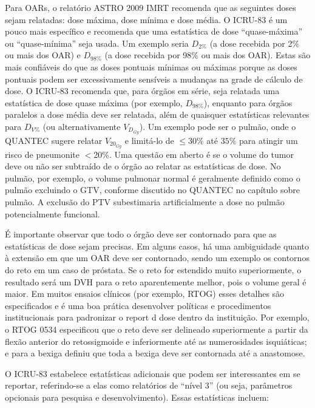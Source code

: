 \documentclass[11pt,a4paper]{article}
\newcounter{exemplo}
\begin{document}
	Para OARs, o relatório ASTRO 2009 IMRT recomenda que as seguintes doses sejam relatadas: dose máxima, dose mínima e dose média. O ICRU-83 é um pouco mais específico e recomenda que uma estatística de dose “quase-máxima” ou “quase-mínima” seja usada. Um exemplo seria $D_{2\%}$ (a dose recebida por 2\% ou mais dos OAR) e $D_{98\%}$ (a dose recebida por 98\% ou mais dos OAR). Estas são mais confiáveis do que as doses pontuais mínimas ou máximas porque as doses pontuais podem ser excessivamente sensíveis a mudanças na grade de cálculo de dose. O ICRU-83 recomenda que, para órgãos em série, seja relatada uma estatística de dose quase máxima (por exemplo, $D_{98\%}$), enquanto para órgãos paralelos a dose média deve ser relatada, além de quaisquer estatísticas relevantes para $D_{V\%}$ (ou alternativamente $V_{D_{Gy}}$). Um exemplo pode ser o pulmão, onde o QUANTEC sugere relatar $V_{20_{Gy}}$ e limitá-lo de $\leq 30\%$ até $35\%$ para atingir um risco de pneumonite $<$20\%. Uma questão em aberto é se o volume do tumor deve ou não ser subtraído de o órgão ao relatar as estatísticas de dose. No pulmão, por exemplo, o volume pulmonar normal é geralmente definido como o pulmão excluindo o GTV, conforme discutido no QUANTEC no capítulo sobre pulmão. A exclusão do PTV subestimaria artificialmente a dose no pulmão potencialmente funcional.

	É importante observar que todo o órgão deve ser contornado para que as estatísticas de dose sejam precisas. Em alguns casos, há uma ambiguidade quanto à extensão em que um OAR deve ser contornado, sendo um exemplo os contornos do reto em um caso de próstata. Se o reto for estendido muito superiormente, o resultado será um DVH para o reto aparentemente melhor, pois o volume geral é maior. Em muitos ensaios clínicos (por exemplo, RTOG) esses detalhes são especificados e é uma boa prática desenvolver políticas e procedimentos institucionais para padronizar o report d dose dentro da instituição. Por exemplo, o RTOG 0534 especificou que o reto deve ser delineado superiormente a partir da flexão anterior do retossigmoide e  inferiormente até as numerosidades isquiáticas; e para a bexiga definiu que toda a bexiga deve ser contornada até a anastomose.

	O ICRU-83 estabelece estatísticas adicionais que podem ser interessantes em se reportar, referindo-se a elas como relatórios de “nível 3” (ou seja, parâmetros opcionais para pesquisa e desenvolvimento). Essas estatísticas incluem:
\end{document}
